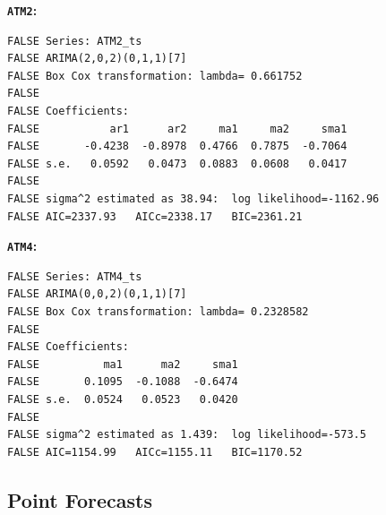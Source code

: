 \documentclass[openany]{book}
\begin{document}
\textbf{\texttt{ATM2}:}

\begin{verbatim}
FALSE Series: ATM2_ts 
FALSE ARIMA(2,0,2)(0,1,1)[7] 
FALSE Box Cox transformation: lambda= 0.661752 
FALSE 
FALSE Coefficients:
FALSE           ar1      ar2     ma1     ma2     sma1
FALSE       -0.4238  -0.8978  0.4766  0.7875  -0.7064
FALSE s.e.   0.0592   0.0473  0.0883  0.0608   0.0417
FALSE 
FALSE sigma^2 estimated as 38.94:  log likelihood=-1162.96
FALSE AIC=2337.93   AICc=2338.17   BIC=2361.21
\end{verbatim}

\textbf{\texttt{ATM4}:}

\begin{verbatim}
FALSE Series: ATM4_ts 
FALSE ARIMA(0,0,2)(0,1,1)[7] 
FALSE Box Cox transformation: lambda= 0.2328582 
FALSE 
FALSE Coefficients:
FALSE          ma1      ma2     sma1
FALSE       0.1095  -0.1088  -0.6474
FALSE s.e.  0.0524   0.0523   0.0420
FALSE 
FALSE sigma^2 estimated as 1.439:  log likelihood=-573.5
FALSE AIC=1154.99   AICc=1155.11   BIC=1170.52
\end{verbatim}

\hypertarget{forecast-a}{%
\subsection*{Point Forecasts}\label{forecast-a}}
\end{document}
